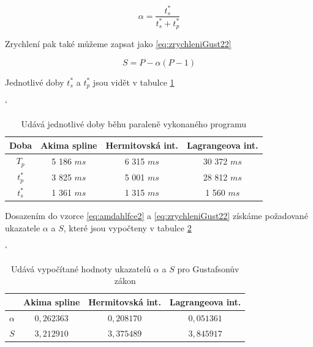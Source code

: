 \documentclass{article}
\begin{document}
	\begin{equation} 
	\alpha = \frac{t_{s}^{*}}{t_{s}^{*} + t_{p}^{*}}
	\label{eq:amdahlfce2}
	\end{equation}
	
	Zrychlení pak také můžeme zapsat jako \ref{eq:zrychleniGust22}
	
	\begin{equation} 
	S = P - \alpha(P-1)
	\label{eq:zrychleniGust22}
	\end{equation}
	
	Jednotlivé doby $t_{s}^{*}$ a $t_{p}^{*}$ jsou vidět v tabulce \ref{tab:doby3}
	
	\begin{table}[h]
	\centering
	\catcode`
	\def\arraystretch{1.2}
	\begin{tabular}{|c|c|c|c|}
	\hline
	\textbf{Doba}   & \textbf{Akima spline} & \textbf{Hermitovská int.} &  \textbf{Lagrangeova int.} \\ \hline
	\hline
	$T_{p}$    		  & 5 186 $m s$                  & 6 315 $m s$     		  &        30 372  $m s$                     \\ \hline
	$t_{p}^{*}$                  & 3 825 $m s$                  & 5 001 $m s$               &       28 812 $m s$                         \\ \hline
	$t_{s}^{*}$           		  & 1 361 $m s$                  & 1 315 $m s$                       & 1 560   $m s$          \\ \hline
	\end{tabular}
	\caption{Udává jednotlivé doby běhu paraleně vykonaného programu}
	\label{tab:doby3}
	\end{table}
	
	Dosazením do vzorce \ref{eq:amdahlfce2} a \ref{eq:zrychleniGust22} získáme požadované ukazatele $\alpha$ a $S$, které jsou vypočteny v tabulce \ref{tab:sfgustik}
	
	
	\begin{table}[h]
	\centering
	\catcode`
	\def\arraystretch{1.2}
	\begin{tabular}{|c|c|c|c|}
	\hline
	\textbf{}   & \textbf{Akima spline} & \textbf{Hermitovská int.} &  \textbf{Lagrangeova int.} \\ \hline
	\hline
	$\alpha$    		  & $0,262363$                  &  $0,208170 $     		  &       $ 0,051361$                     \\ \hline
	$S$                  &  $3,212910 $                  &   $3,375489$               &      $ 3,845917$                         \\ \hline
	\end{tabular}
	\caption{Udává vypočítané hodnoty ukazatelů $\alpha$ a $S$ pro Gustafsonův zákon}
	\label{tab:sfgustik}
	\end{table}
	
\end{document}
